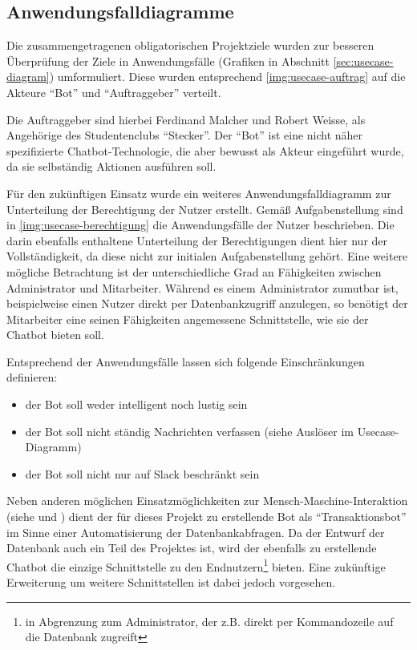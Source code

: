 \subsection{Anwendungsfalldiagramme}

Die zusammengetragenen obligatorischen Projektziele wurden zur besseren Überprüfung der Ziele in Anwendungsfälle (Grafiken in Abschnitt \autoref{sec:usecase-diagram}) umformuliert. Diese wurden entsprechend \autoref{img:usecase-auftrag} auf die Akteure \enquote{Bot} und \enquote{Auftraggeber} verteilt.

Die Auftraggeber sind hierbei Ferdinand Malcher und Robert Weisse, als Angehörige des Studentenclubs \enquote{Stecker}. Der \enquote{Bot} ist eine nicht näher spezifizierte Chatbot-Technologie, die aber bewusst als Akteur eingeführt wurde, da sie selbständig Aktionen ausführen soll.

Für den zukünftigen Einsatz wurde ein weiteres Anwendungsfalldiagramm zur Unterteilung der Berechtigung der Nutzer erstellt. Gemäß Aufgabenstellung sind in \autoref{img:usecase-berechtigung} die Anwendungsfälle der Nutzer beschrieben. Die darin ebenfalls enthaltene Unterteilung der Berechtigungen dient hier nur der Vollständigkeit, da diese nicht zur initialen Aufgabenstellung gehört.
Eine weitere mögliche Betrachtung ist der unterschiedliche Grad an Fähigkeiten zwischen Administrator und Mitarbeiter. Während es einem Administrator zumutbar ist, beispielweise einen Nutzer direkt per Datenbankzugriff anzulegen, so benötigt der Mitarbeiter eine seinen Fähigkeiten angemessene Schnittstelle, wie sie der Chatbot bieten soll.


Entsprechend der Anwendungsfälle lassen sich folgende Einschränkungen definieren:

\begin{itemize}
    \item der Bot soll weder intelligent noch lustig sein
    \item der Bot soll nicht ständig Nachrichten verfassen (siehe Auslöser im Usecase-Diagramm)
    \item der Bot soll nicht nur auf Slack beschränkt sein
\end{itemize}

Neben anderen möglichen Einsatzmöglichkeiten zur Mensch-Maschine-Interaktion (siehe \cite{PanConversationalInterfacesFuture2017} und \cite{GruensteinConversationalInterfaces2009}) dient der für dieses Projekt zu erstellende Bot als \enquote{Transaktionsbot} im Sinne einer Automatisierung der Datenbankabfragen. Da der Entwurf der Datenbank auch ein Teil des Projektes ist, wird der ebenfalls zu erstellende Chatbot die einzige Schnittstelle zu den Endnutzern\footnote{in Abgrenzung zum Administrator, der z.B. direkt per Kommandozeile auf die Datenbank zugreift} bieten. Eine zukünftige Erweiterung um weitere Schnittstellen ist dabei jedoch vorgesehen.

